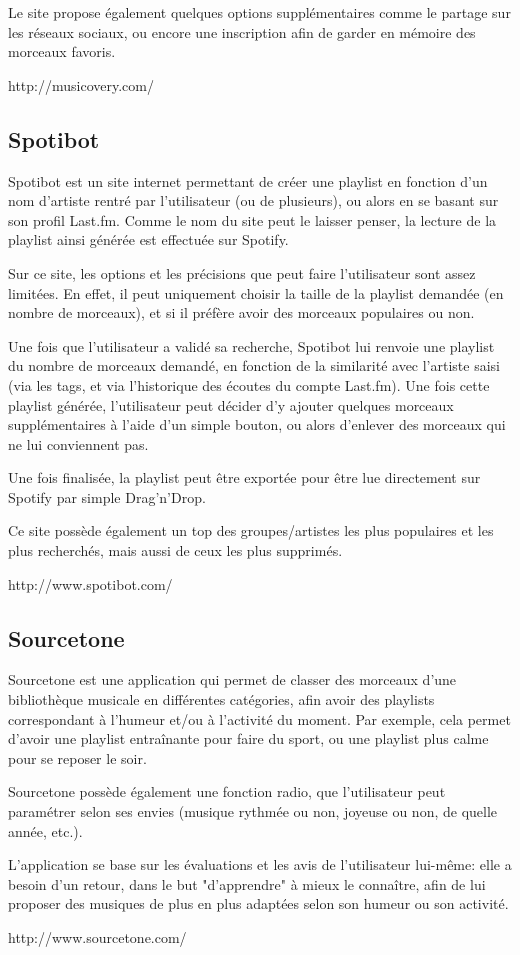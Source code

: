 Le site propose également quelques options supplémentaires comme le partage 
sur les réseaux sociaux, ou encore une inscription afin de garder en mémoire 
des morceaux favoris.

http://musicovery.com/

\subsection{Spotibot}
\label{existant:spotibot}

Spotibot est un site internet permettant de créer une playlist en fonction 
d'un nom d'artiste rentré par l'utilisateur (ou de plusieurs), ou alors en 
se basant sur son profil Last.fm. Comme le nom du site peut le laisser 
penser, la lecture de la playlist ainsi générée est effectuée sur Spotify.

Sur ce site, les options et les précisions que peut faire l'utilisateur sont 
assez limitées. En effet, il peut uniquement choisir la taille de la 
playlist demandée (en nombre de morceaux), et si il préfère avoir des 
morceaux populaires ou non.

Une fois que l'utilisateur a validé sa recherche, Spotibot lui renvoie une 
playlist du nombre de morceaux demandé, en fonction de la similarité avec 
l'artiste saisi (via les tags, et via l'historique des écoutes du compte 
Last.fm). Une fois cette playlist générée, l'utilisateur peut décider d'y 
ajouter quelques morceaux supplémentaires à l'aide d'un simple bouton, ou 
alors d'enlever des morceaux qui ne lui conviennent pas.

Une fois finalisée, la playlist peut être exportée pour être lue directement 
sur Spotify par simple Drag'n'Drop.

Ce site possède également un top des groupes/artistes les plus populaires et 
les plus recherchés, mais aussi de ceux les plus supprimés.

http://www.spotibot.com/

\subsection{Sourcetone}
\label{existant:sourcetone}

Sourcetone est une application qui permet de classer des morceaux d'une 
bibliothèque musicale en différentes catégories, afin avoir des playlists 
correspondant à l'humeur et/ou à l'activité du moment. Par exemple, cela 
permet d'avoir une playlist entraînante pour faire du sport, ou une playlist 
plus calme pour se reposer le soir.

Sourcetone possède également une fonction radio, que l'utilisateur peut 
paramétrer selon ses envies (musique rythmée ou non, joyeuse ou non, de 
quelle année, etc.).

L'application se base sur les évaluations et les avis de l'utilisateur 
lui-même: elle a besoin d'un retour, dans le but "d'apprendre" à mieux le 
connaître, afin de lui proposer des musiques de plus en plus adaptées selon 
son humeur ou son activité.

http://www.sourcetone.com/